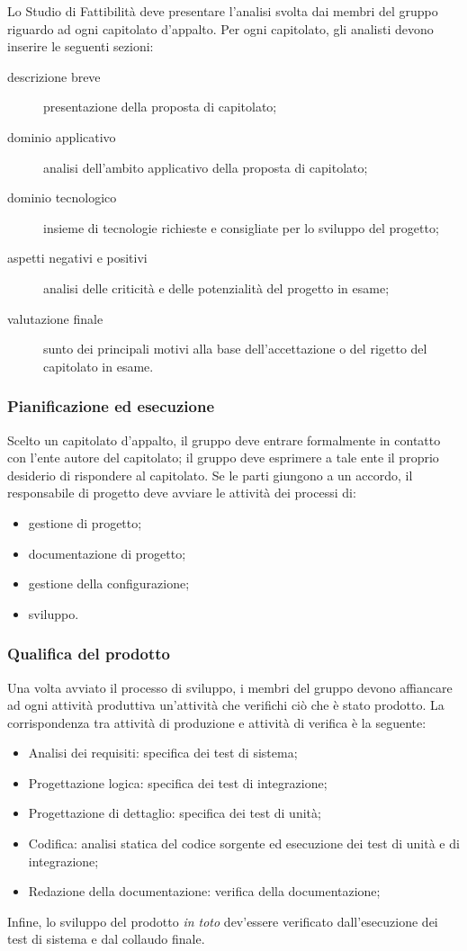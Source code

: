 Lo Studio di Fattibilità deve presentare l'analisi svolta dai membri del gruppo riguardo ad ogni capitolato d'appalto. Per ogni capitolato, gli analisti devono inserire le seguenti sezioni:
\begin{description}
	\item[descrizione breve] presentazione della proposta di capitolato; 
	\item[dominio applicativo] analisi dell'ambito applicativo della proposta di capitolato; 
	\item[dominio tecnologico] insieme di tecnologie richieste e consigliate per lo sviluppo del progetto;
	\item[aspetti negativi e positivi] analisi delle criticità e delle potenzialità del progetto in esame;
	\item[valutazione finale] sunto dei principali motivi alla base dell'accettazione o del rigetto del capitolato in esame.
\end{description}

\subsubsection{Pianificazione ed esecuzione}
Scelto un capitolato d'appalto, il gruppo deve entrare formalmente in contatto con l'ente autore del capitolato; il gruppo deve esprimere a tale ente il proprio desiderio di rispondere al capitolato. Se le parti giungono a un accordo, il responsabile di progetto deve avviare le attività dei processi di:
\begin{itemize}
	\item gestione di progetto;
	\item documentazione di progetto;
	\item gestione della configurazione;
	\item sviluppo.
\end{itemize}

\subsubsection{Qualifica del prodotto}
Una volta avviato il processo di sviluppo, i membri del gruppo devono affiancare ad ogni attività produttiva un'attività che verifichi ciò che è stato prodotto. La corrispondenza tra attività di produzione e attività di verifica è la seguente:
\begin{itemize}
	\item Analisi dei requisiti: specifica dei test di sistema;
	\item Progettazione logica: specifica dei test di integrazione;
	\item Progettazione di dettaglio: specifica dei test di unità;
	\item Codifica: analisi statica del codice sorgente ed esecuzione dei test di unità e di integrazione;
	\item Redazione della documentazione: verifica della documentazione;
\end{itemize}
Infine, lo sviluppo del prodotto \emph{in toto} dev'essere verificato dall'esecuzione dei test di sistema e dal collaudo finale.

